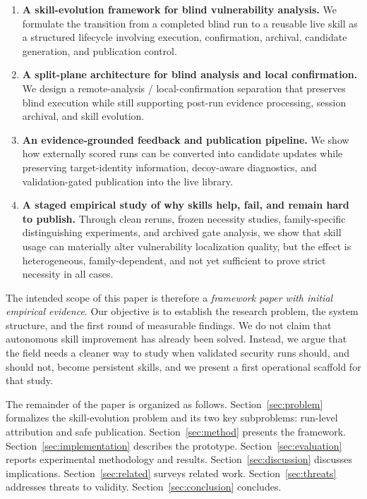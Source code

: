 ﻿\documentclass[preprint,12pt]{elsarticle}
\begin{document}
\begin{enumerate}[leftmargin=*]
    \item \textbf{A skill-evolution framework for blind vulnerability
    analysis.} We formulate the transition from a completed blind run to a
    reusable live skill as a structured lifecycle involving execution,
    confirmation, archival, candidate generation, and publication control.

    \item \textbf{A split-plane architecture for blind analysis and local
    confirmation.} We design a remote-analysis / local-confirmation
    separation that preserves blind execution while still supporting
    post-run evidence processing, session archival, and skill evolution.

    \item \textbf{An evidence-grounded feedback and publication pipeline.}
    We show how externally scored runs can be converted into candidate
    updates while preserving target-identity information, decoy-aware
    diagnostics, and validation-gated publication into the live library.

    \item \textbf{A staged empirical study of why skills help, fail, and
    remain hard to publish.} Through clean reruns, frozen necessity
    studies, family-specific distinguishing experiments, and archived gate
    analysis, we show that skill usage can materially alter vulnerability
    localization quality, but the effect is heterogeneous, family-dependent,
    and not yet sufficient to prove strict necessity in all cases.
\end{enumerate}

The intended scope of this paper is therefore a \emph{framework paper with
initial empirical evidence}.  Our objective is to establish the research
problem, the system structure, and the first round of measurable findings.
We do not claim that autonomous skill improvement has already been solved.
Instead, we argue that the field needs a cleaner way to study when
validated security runs should, and should not, become persistent skills,
and we present a first operational scaffold for that study.

The remainder of the paper is organized as follows.
Section~\ref{sec:problem} formalizes the skill-evolution problem and its
two key subproblems: run-level attribution and safe publication.
Section~\ref{sec:method} presents the framework.
Section~\ref{sec:implementation} describes the prototype.
Section~\ref{sec:evaluation} reports experimental methodology and results.
Section~\ref{sec:discussion} discusses implications.
Section~\ref{sec:related} surveys related work.
Section~\ref{sec:threats} addresses threats to validity.
Section~\ref{sec:conclusion} concludes.
\end{document}
